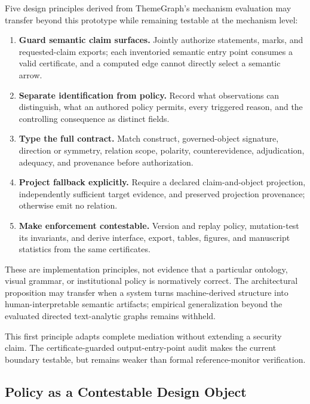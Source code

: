 \documentclass[manuscript,screen,review,anonymous]{acmart}
\begin{document}
Five design principles derived from ThemeGraph's mechanism evaluation may transfer beyond this prototype while remaining testable at the mechanism level:
\begin{enumerate}
  \item \textbf{Guard semantic claim surfaces.} Jointly authorize statements, marks, and requested-claim exports; each inventoried semantic entry point consumes a valid certificate, and a computed edge cannot directly select a semantic arrow.
  \item \textbf{Separate identification from policy.} Record what observations can distinguish, what an authored policy permits, every triggered reason, and the controlling consequence as distinct fields.
  \item \textbf{Type the full contract.} Match construct, governed-object signature, direction or symmetry, relation scope, polarity, counterevidence, adjudication, adequacy, and provenance before authorization.
  \item \textbf{Project fallback explicitly.} Require a declared claim-and-object projection, independently sufficient target evidence, and preserved projection provenance; otherwise emit no relation.
  \item \textbf{Make enforcement contestable.} Version and replay policy, mutation-test its invariants, and derive interface, export, tables, figures, and manuscript statistics from the same certificates.
\end{enumerate}
These are implementation principles, not evidence that a particular ontology, visual grammar, or institutional policy is normatively correct. The architectural proposition may transfer when a system turns machine-derived structure into human-interpretable semantic artifacts; empirical generalization beyond the evaluated directed text-analytic graphs remains withheld.

This first principle adapts complete mediation without extending a security claim. The certificate-guarded output-entry-point audit makes the current boundary testable, but remains weaker than formal reference-monitor verification.

\subsection{Policy as a Contestable Design Object}
\end{document}
